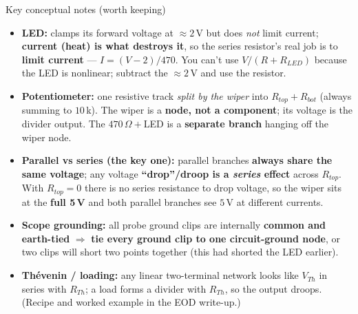 \documentclass[11pt,a4paper]{article}
\begin{document}
\vspace{4pt}
\begin{notebox}{Key conceptual notes (worth keeping)}
\begin{itemize}
  \item \textbf{LED:} clamps its forward voltage at $\approx 2$\,V but does \emph{not} limit current; \textbf{current (heat) is what destroys it}, so the series resistor's real job is to \textbf{limit current} --- $I=(V-2)/470$. You can't use $V/(R+R_{LED})$ because the LED is nonlinear; subtract the $\approx 2$\,V and use the resistor.
  \item \textbf{Potentiometer:} one resistive track \emph{split by the wiper} into $R_{top}+R_{bot}$ (always summing to $10$\,k). The wiper is a \textbf{node, not a component}; its voltage is the divider output. The $470\,\Omega+$LED is a \textbf{separate branch} hanging off the wiper node.
  \item \textbf{Parallel vs series (the key one):} parallel branches \textbf{always share the same voltage}; any voltage \textbf{``drop''/droop is a \emph{series} effect} across $R_{top}$. With $R_{top}=0$ there is no series resistance to drop voltage, so the wiper sits at the \textbf{full 5\,V} and both parallel branches see $5$\,V at different currents.
  \item \textbf{Scope grounding:} all probe ground clips are internally \textbf{common and earth-tied} $\Rightarrow$ \textbf{tie every ground clip to one circuit-ground node}, or two clips will short two points together (this had shorted the LED earlier).
  \item \textbf{Th\'evenin / loading:} any linear two-terminal network looks like $V_{Th}$ in series with $R_{Th}$; a load forms a divider with $R_{Th}$, so the output droops. (Recipe and worked example in the EOD write-up.)
\end{itemize}
\end{notebox}
\end{document}
